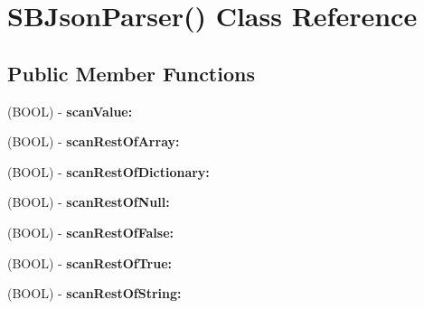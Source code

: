 \hypertarget{interface_s_b_json_parser_07_08}{
\section{\-S\-B\-Json\-Parser() \-Class \-Reference}
\label{interface_s_b_json_parser_07_08}
}
\subsection*{\-Public \-Member \-Functions}
\begin{DoxyCompactItemize}
\item 
\hypertarget{interface_s_b_json_parser_07_08_ac636e0452108eb160cef77b66e912b0a}{
(\-B\-O\-O\-L) -\/ {\bfseries scan\-Value\-:}}
\label{interface_s_b_json_parser_07_08_ac636e0452108eb160cef77b66e912b0a}

\item 
\hypertarget{interface_s_b_json_parser_07_08_a081c4ee408752efed7e907d9f9c2d4ca}{
(\-B\-O\-O\-L) -\/ {\bfseries scan\-Rest\-Of\-Array\-:}}
\label{interface_s_b_json_parser_07_08_a081c4ee408752efed7e907d9f9c2d4ca}

\item 
\hypertarget{interface_s_b_json_parser_07_08_a3de09621653a0a1cd940f227d043bacb}{
(\-B\-O\-O\-L) -\/ {\bfseries scan\-Rest\-Of\-Dictionary\-:}}
\label{interface_s_b_json_parser_07_08_a3de09621653a0a1cd940f227d043bacb}

\item 
\hypertarget{interface_s_b_json_parser_07_08_aeea34f47e63b11e406fa6a7b96108190}{
(\-B\-O\-O\-L) -\/ {\bfseries scan\-Rest\-Of\-Null\-:}}
\label{interface_s_b_json_parser_07_08_aeea34f47e63b11e406fa6a7b96108190}

\item 
\hypertarget{interface_s_b_json_parser_07_08_a9b7107e91b570bcb02fb42d1003ead3b}{
(\-B\-O\-O\-L) -\/ {\bfseries scan\-Rest\-Of\-False\-:}}
\label{interface_s_b_json_parser_07_08_a9b7107e91b570bcb02fb42d1003ead3b}

\item 
\hypertarget{interface_s_b_json_parser_07_08_a246c0a820e6fd69db1bbe79167c578c6}{
(\-B\-O\-O\-L) -\/ {\bfseries scan\-Rest\-Of\-True\-:}}
\label{interface_s_b_json_parser_07_08_a246c0a820e6fd69db1bbe79167c578c6}

\item 
\hypertarget{interface_s_b_json_parser_07_08_a0b251c81dc2753e3330709af36112429}{
(\-B\-O\-O\-L) -\/ {\bfseries scan\-Rest\-Of\-String\-:}}
\label{interface_s_b_json_parser_07_08_a0b251c81dc2753e3330709af36112429}


\end{DoxyCompactItemize}
